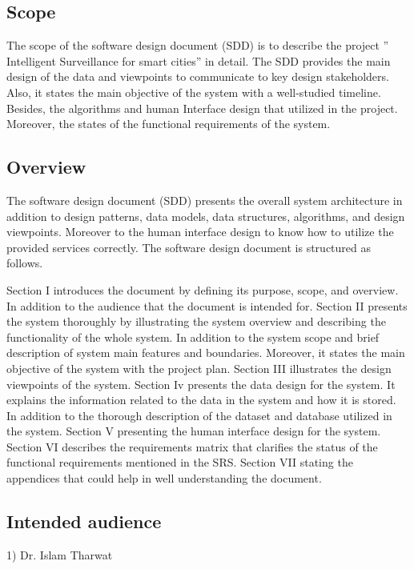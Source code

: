 \documentclass[12pt]{article}
\begin{document}
\subsection{Scope}

The scope of the software design document (SDD) is to describe the project ” Intelligent Surveillance for smart cities” in detail. The SDD provides the main design of the data and viewpoints to communicate to key design stakeholders. Also, it states the main objective of the system with a well-studied timeline. Besides, the algorithms and human Interface design that utilized in the project. Moreover, the states of the functional requirements of the system.

\subsection{Overview}
The software design document (SDD) presents the overall system architecture in addition to design patterns, data models, data structures, algorithms, and design viewpoints. Moreover to the human interface design to know how to utilize the provided services correctly. The software design document is structured as follows.

 Section I introduces the document by defining its purpose, scope, and overview. In addition to the audience that the document is intended for. Section II presents the system thoroughly by illustrating the system overview and describing the functionality of the whole system. In addition to the system scope and brief description of system main features and boundaries. Moreover, it states the main objective of the system with the project plan. Section III illustrates the design viewpoints of the system. Section Iv presents the data design for the system. It explains the information related to the data in the system and how it is stored. In addition to the thorough description of the dataset and database utilized in the system. Section V presenting the human interface design for the system. Section VI describes the requirements matrix that clarifies the status of the functional requirements mentioned in the SRS. Section VII stating the appendices that could help in well understanding the document.

\subsection{Intended audience}

1)	Dr. Islam Tharwat
\end{document}
